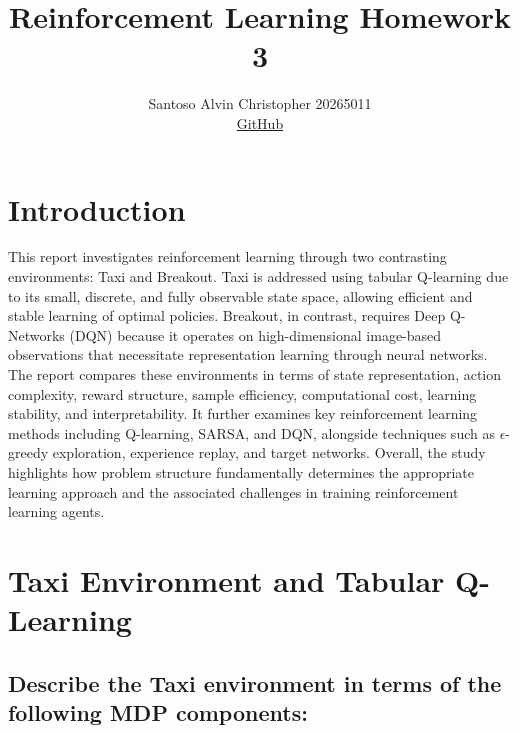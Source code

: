 \documentclass[11pt]{article}
\title{\vspace{-1.0cm}Reinforcement Learning Homework 3}
\author{Santoso Alvin Christopher 20265011 \\
\href{https://github.com/alvinsnt/reinforcement-learning-experiments}{GitHub}
}
\date{}
\begin{document}
\maketitle

\section*{Introduction}

This report investigates reinforcement learning through two contrasting environments: Taxi and Breakout. Taxi is addressed using tabular Q-learning due to its small, discrete, and fully observable state space, allowing efficient and stable learning of optimal policies. Breakout, in contrast, requires Deep Q-Networks (DQN) because it operates on high-dimensional image-based observations that necessitate representation learning through neural networks. The report compares these environments in terms of state representation, action complexity, reward structure, sample efficiency, computational cost, learning stability, and interpretability. It further examines key reinforcement learning methods including Q-learning, SARSA, and DQN, alongside techniques such as $\epsilon$-greedy exploration, experience replay, and target networks. Overall, the study highlights how problem structure fundamentally determines the appropriate learning approach and the associated challenges in training reinforcement learning agents.

\section*{Taxi Environment and Tabular Q-Learning}

\subsection*{Describe the Taxi environment in terms of the following MDP components:}
\end{document}
